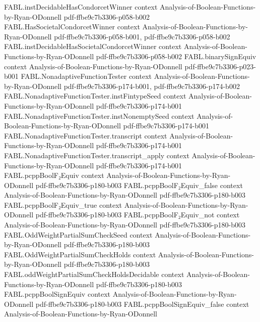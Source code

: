 \begin{theorem}
\proofstep
  {FABL.instDecidableHasCondorcetWinner}
  {context}
  {Analysis-of-Boolean-Functions-by-Ryan-ODonnell}
  {pdf-ffbe9c7b3306-p058-b002}
\proofstep
  {FABL.HasSocietalCondorcetWinner}
  {context}
  {Analysis-of-Boolean-Functions-by-Ryan-ODonnell}
  {pdf-ffbe9c7b3306-p058-b001,
    pdf-ffbe9c7b3306-p058-b002}
\proofstep
  {FABL.instDecidableHasSocietalCondorcetWinner}
  {context}
  {Analysis-of-Boolean-Functions-by-Ryan-ODonnell}
  {pdf-ffbe9c7b3306-p058-b002}
\proofstep
  {FABL.binarySignEquiv}
  {context}
  {Analysis-of-Boolean-Functions-by-Ryan-ODonnell}
  {pdf-ffbe9c7b3306-p023-b001}
\proofstep
  {FABL.NonadaptiveFunctionTester}
  {context}
  {Analysis-of-Boolean-Functions-by-Ryan-ODonnell}
  {pdf-ffbe9c7b3306-p174-b001,
    pdf-ffbe9c7b3306-p174-b002}
\proofstep
  {FABL.NonadaptiveFunctionTester.instFintypeSeed}
  {context}
  {Analysis-of-Boolean-Functions-by-Ryan-ODonnell}
  {pdf-ffbe9c7b3306-p174-b001}
\proofstep
  {FABL.NonadaptiveFunctionTester.instNonemptySeed}
  {context}
  {Analysis-of-Boolean-Functions-by-Ryan-ODonnell}
  {pdf-ffbe9c7b3306-p174-b001}
\proofstep
  {FABL.NonadaptiveFunctionTester.transcript}
  {context}
  {Analysis-of-Boolean-Functions-by-Ryan-ODonnell}
  {pdf-ffbe9c7b3306-p174-b001}
\proofstep
  {FABL.NonadaptiveFunctionTester.transcript_apply}
  {context}
  {Analysis-of-Boolean-Functions-by-Ryan-ODonnell}
  {pdf-ffbe9c7b3306-p174-b001}
\proofstep
  {FABL.pcppBoolF₂Equiv}
  {context}
  {Analysis-of-Boolean-Functions-by-Ryan-ODonnell}
  {pdf-ffbe9c7b3306-p180-b003}
\proofstep
  {FABL.pcppBoolF₂Equiv_false}
  {context}
  {Analysis-of-Boolean-Functions-by-Ryan-ODonnell}
  {pdf-ffbe9c7b3306-p180-b003}
\proofstep
  {FABL.pcppBoolF₂Equiv_true}
  {context}
  {Analysis-of-Boolean-Functions-by-Ryan-ODonnell}
  {pdf-ffbe9c7b3306-p180-b003}
\proofstep
  {FABL.pcppBoolF₂Equiv_not}
  {context}
  {Analysis-of-Boolean-Functions-by-Ryan-ODonnell}
  {pdf-ffbe9c7b3306-p180-b003}
\proofstep
  {FABL.OddWeightPartialSumCheckSeed}
  {context}
  {Analysis-of-Boolean-Functions-by-Ryan-ODonnell}
  {pdf-ffbe9c7b3306-p180-b003}
\proofstep
  {FABL.OddWeightPartialSumCheckHolds}
  {context}
  {Analysis-of-Boolean-Functions-by-Ryan-ODonnell}
  {pdf-ffbe9c7b3306-p180-b003}
\proofstep
  {FABL.oddWeightPartialSumCheckHoldsDecidable}
  {context}
  {Analysis-of-Boolean-Functions-by-Ryan-ODonnell}
  {pdf-ffbe9c7b3306-p180-b003}
\proofstep
  {FABL.pcppBoolSignEquiv}
  {context}
  {Analysis-of-Boolean-Functions-by-Ryan-ODonnell}
  {pdf-ffbe9c7b3306-p180-b003}
\proofstep
  {FABL.pcppBoolSignEquiv_false}
  {context}
  {Analysis-of-Boolean-Functions-by-Ryan-ODonnell}

\end{theorem}
